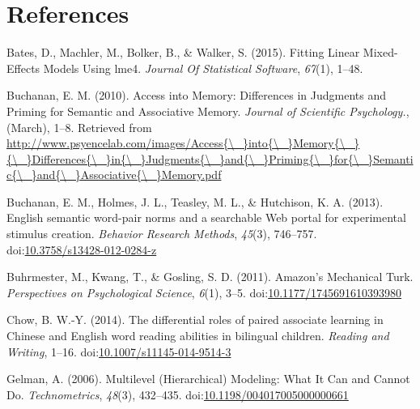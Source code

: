 \documentclass[english,man]{apa6}
\theoremstyle{definition}
\theoremstyle{definition}
\theoremstyle{remark}
\begin{document}
\newpage

\section{References}\label{references}

\setlength{\parindent}{-0.5in} \setlength{\leftskip}{0.5in}

\hypertarget{refs}{}
\hypertarget{ref-Bates2015}{}
Bates, D., Machler, M., Bolker, B., \& Walker, S. (2015). Fitting Linear
Mixed-Effects Models Using lme4. \emph{Journal Of Statistical Software},
\emph{67}(1), 1--48.

\hypertarget{ref-Buchanan2010}{}
Buchanan, E. M. (2010). Access into Memory: Differences in Judgments and
Priming for Semantic and Associative Memory. \emph{Journal of Scientific
Psychology.}, (March), 1--8. Retrieved from
\href{http://www.psyencelab.com/images/Access\%7B/_\%7Dinto\%7B/_\%7DMemory\%7B/_\%7D\%7B/_\%7DDifferences\%7B/_\%7Din\%7B/_\%7DJudgments\%7B/_\%7Dand\%7B/_\%7DPriming\%7B/_\%7Dfor\%7B/_\%7DSemantic\%7B/_\%7Dand\%7B/_\%7DAssociative\%7B/_\%7DMemory.pdf}{http://www.psyencelab.com/images/Access\{\textbackslash{}\_\}into\{\textbackslash{}\_\}Memory\{\textbackslash{}\_\}\{\textbackslash{}\_\}Differences\{\textbackslash{}\_\}in\{\textbackslash{}\_\}Judgments\{\textbackslash{}\_\}and\{\textbackslash{}\_\}Priming\{\textbackslash{}\_\}for\{\textbackslash{}\_\}Semantic\{\textbackslash{}\_\}and\{\textbackslash{}\_\}Associative\{\textbackslash{}\_\}Memory.pdf}

\hypertarget{ref-Buchanan2013}{}
Buchanan, E. M., Holmes, J. L., Teasley, M. L., \& Hutchison, K. A.
(2013). English semantic word-pair norms and a searchable Web portal for
experimental stimulus creation. \emph{Behavior Research Methods},
\emph{45}(3), 746--757.
doi:\href{https://doi.org/10.3758/s13428-012-0284-z}{10.3758/s13428-012-0284-z}

\hypertarget{ref-Buhrmester2011}{}
Buhrmester, M., Kwang, T., \& Gosling, S. D. (2011). Amazon's Mechanical
Turk. \emph{Perspectives on Psychological Science}, \emph{6}(1), 3--5.
doi:\href{https://doi.org/10.1177/1745691610393980}{10.1177/1745691610393980}

\hypertarget{ref-Chow2014}{}
Chow, B. W.-Y. (2014). The differential roles of paired associate
learning in Chinese and English word reading abilities in bilingual
children. \emph{Reading and Writing}, 1--16.
doi:\href{https://doi.org/10.1007/s11145-014-9514-3}{10.1007/s11145-014-9514-3}

\hypertarget{ref-Gelman2006}{}
Gelman, A. (2006). Multilevel (Hierarchical) Modeling: What It Can and
Cannot Do. \emph{Technometrics}, \emph{48}(3), 432--435.
doi:\href{https://doi.org/10.1198/004017005000000661}{10.1198/004017005000000661}
\end{document}
